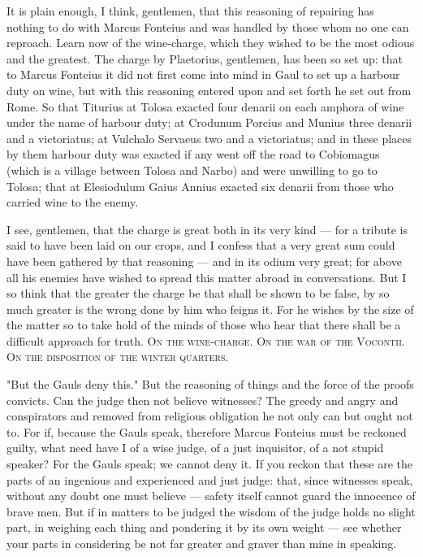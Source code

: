  It is plain enough, I think, gentlemen, that this reasoning of repairing has nothing to do with Marcus Fonteius and was handled by those whom no one can reproach. Learn now of the wine-charge, which they wished to be the most odious and the greatest. The charge by Plaetorius, gentlemen, has been so set up: that to Marcus Fonteius it did not first come into mind in Gaul to set up a harbour duty on wine, but with this reasoning entered upon and set forth he set out from Rome. So that Titurius at Tolosa exacted four denarii on each amphora of wine under the name of harbour duty; at Crodunum Porcius and Munius three denarii and a victoriatus; at Vulchalo Servaeus two and a victoriatus; and in these places by them harbour duty was exacted if any went off the road to Cobiomagus (which is a village between Tolosa and Narbo) and were unwilling to go to Tolosa; that at Elesiodulum Gaius Annius exacted six denarii from those who carried wine to the enemy.

 I see, gentlemen, that the charge is great both in its very kind --- for a tribute is said to have been laid on our crops, and I confess that a very great sum could have been gathered by that reasoning --- and in its odium very great; for above all his enemies have wished to spread this matter abroad in conversations. But I so think that the greater the charge be that shall be shown to be false, by so much greater is the wrong done by him who feigns it. For he wishes by the size of the matter so to take hold of the minds of those who hear that there shall be a difficult approach for truth. \textsc{On the wine-charge. On the war of the Vocontii. On the disposition of the winter quarters}.

 "But the Gauls deny this." But the reasoning of things and the force of the proofs convicts. Can the judge then not believe witnesses? The greedy and angry and conspirators and removed from religious obligation he not only can but ought not to. For if, because the Gauls speak, therefore Marcus Fonteius must be reckoned guilty, what need have I of a wise judge, of a just inquisitor, of a not stupid speaker? For the Gauls speak; we cannot deny it. If you reckon that these are the parts of an ingenious and experienced and just judge: that, since witnesses speak, without any doubt one must believe --- safety itself cannot guard the innocence of brave men. But if in matters to be judged the wisdom of the judge holds no slight part, in weighing each thing and pondering it by its own weight --- see whether your parts in considering be not far greater and graver than mine in speaking.

